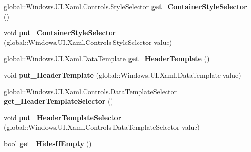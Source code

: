 \begin{DoxyCompactItemize}
\mbox{\label{interface_windows_1_1_u_i_1_1_xaml_1_1_controls_1_1_i_group_style_a56b3461ac75ac985ef5d7d81a6c6a9cf}} 
global\+::\+Windows.\+U\+I.\+Xaml.\+Controls.\+Style\+Selector {\bfseries get\+\_\+\+Container\+Style\+Selector} ()
\item 
\mbox{\label{interface_windows_1_1_u_i_1_1_xaml_1_1_controls_1_1_i_group_style_a02ae70e78fa1f73a90c99f25ffb93918}} 
void {\bfseries put\+\_\+\+Container\+Style\+Selector} (global\+::\+Windows.\+U\+I.\+Xaml.\+Controls.\+Style\+Selector value)
\item 
\mbox{\label{interface_windows_1_1_u_i_1_1_xaml_1_1_controls_1_1_i_group_style_ae2c73494e7acf4a2194f66515b44cb36}} 
global\+::\+Windows.\+U\+I.\+Xaml.\+Data\+Template {\bfseries get\+\_\+\+Header\+Template} ()
\item 
\mbox{\label{interface_windows_1_1_u_i_1_1_xaml_1_1_controls_1_1_i_group_style_a740a71b8b3a99bb878e9ba66ebae7c4d}} 
void {\bfseries put\+\_\+\+Header\+Template} (global\+::\+Windows.\+U\+I.\+Xaml.\+Data\+Template value)
\item 
\mbox{\label{interface_windows_1_1_u_i_1_1_xaml_1_1_controls_1_1_i_group_style_a28c8a1b47d3dbd9c19e2499b6b78dd6b}} 
global\+::\+Windows.\+U\+I.\+Xaml.\+Controls.\+Data\+Template\+Selector {\bfseries get\+\_\+\+Header\+Template\+Selector} ()
\item 
\mbox{\label{interface_windows_1_1_u_i_1_1_xaml_1_1_controls_1_1_i_group_style_a7afe7db38684a1546bd50fa72f58ec53}} 
void {\bfseries put\+\_\+\+Header\+Template\+Selector} (global\+::\+Windows.\+U\+I.\+Xaml.\+Controls.\+Data\+Template\+Selector value)
\item 
\mbox{\label{interface_windows_1_1_u_i_1_1_xaml_1_1_controls_1_1_i_group_style_a9bc855cd77a4f2a8ba5d4c3e7c7174a9}} 
bool {\bfseries get\+\_\+\+Hides\+If\+Empty} ()

\end{DoxyCompactItemize}
